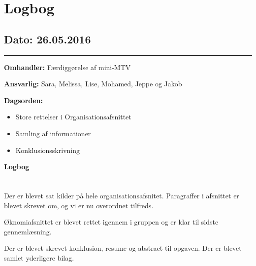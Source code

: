 \chapter{Logbog}

\section{Dato: 26.05.2016}
\hrule

\textbf{Omhandler:} Færdiggørelse af mini-MTV

\textbf{Ansvarlig:} Sara, Melissa, Lise, Mohamed, Jeppe og Jakob

\textbf{Dagsorden:}
\begin{itemize}
	\item Store rettelser i Organisationsafsnittet
	\item Samling af informationer
	\item Konklusionsskrivning 
\end{itemize}

\textbf{Logbog}
\\
\\ \\
Der er blevet sat kilder på hele organisationsafsnitet. Paragraffer i afsnittet er blevet skrevet om, og vi er nu overordnet tilfreds. 

Øknomiafsnittet er blevet rettet igennem i gruppen og er klar til sidste gennemlæsning. 

Der er blevet skrevet konklusion, resume og abstract til opgaven. Der er blevet samlet yderligere bilag. 
 



